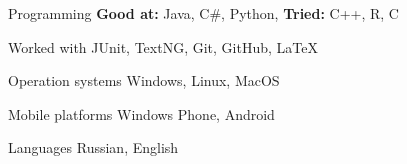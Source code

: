 


\begin{cvskills}


\cvskill
{Programming} %
{\textbf{Good at:} Java, C\#, Python, \textbf{Tried:} C++, R, C} %

\cvskill
{Worked with} %
{JUnit, TextNG, Git, GitHub, LaTeX} %

\cvskill
{Operation systems} %
{Windows, Linux, MacOS} %

\cvskill
{Mobile platforms} %
{Windows Phone, Android} %


\cvskill
{Languages} %
{Russian, English} %


\end{cvskills}
